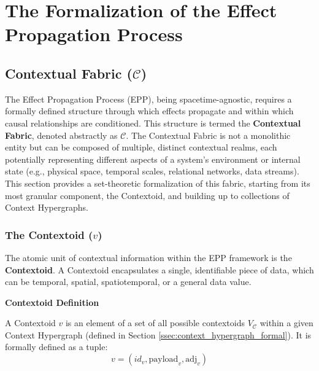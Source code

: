 


\section{The Formalization of the Effect Propagation Process}
\label{sec:formalization}


\subsection[Contextual Fabric (C)]{Contextual Fabric (\(\mathcal{C}\))}
\label{sec:formalization_context}

The Effect Propagation Process (EPP), being spacetime-agnostic, requires a formally defined structure through which effects propagate and within which causal relationships are conditioned. This structure is termed the \textbf{Contextual Fabric}, denoted abstractly as \(\mathcal{C}\). The Contextual Fabric is not a monolithic entity but can be composed of multiple, distinct contextual realms, each potentially representing different aspects of a system's environment or internal state (e.g., physical space, temporal scales, relational networks, data streams). This section provides a set-theoretic formalization of this fabric, starting from its most granular component, the Contextoid, and building up to collections of Context Hypergraphs.


\subsubsection[The Contextoid (v)]{The Contextoid (\(v\))}
\label{ssec:contextoid_formal}

The atomic unit of contextual information within the EPP framework is the \textbf{Contextoid}. A Contextoid encapsulates a single, identifiable piece of data, which can be temporal, spatial, spatiotemporal, or a general data value.

\textbf{Contextoid Definition}

A Contextoid \( v \) is an element of a set of all possible contextoids \( V_{\mathcal{C}} \) within a given Context Hypergraph (defined in Section \ref{ssec:context_hypergraph_formal}). It is formally defined as a tuple:
\[ v = (id_v, \text{payload}_v, \text{adj}_v) \]


